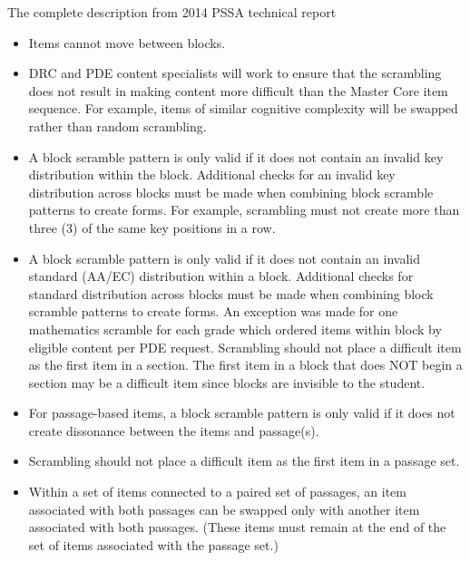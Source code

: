 \documentclass[11pt]{article}
\begin{document}
The complete description from 2014 PSSA technical report
\begin{itemize}
\item Items cannot move between blocks.
\item DRC and PDE content specialists will work to ensure that the
  scrambling does not result in making content more difficult than the
  Master Core item sequence. For example, items of similar cognitive
  complexity will be swapped rather than random scrambling.
\item A block scramble pattern is only valid if it does not contain an
  invalid key distribution within the block. Additional checks for an
  invalid key distribution across blocks must be made when combining
  block scramble patterns to create forms. For example, scrambling
  must not create more than three (3) of the same key positions in a
  row.
\item A block scramble pattern is only valid if it does not contain an
  invalid standard (AA/EC) distribution within a block. Additional
  checks for standard distribution across blocks must be made when
  combining block scramble patterns to create forms.  An exception was
  made for one mathematics scramble for each grade which ordered items
  within block by eligible content per PDE request.  Scrambling should
  not place a difficult item as the first item in a section. The first
  item in a block that does NOT begin a section may be a difficult
  item since blocks are invisible to the student.
\item For passage-based items, a block scramble pattern is only valid
  if it does not create dissonance between the items and passage(s).
\item Scrambling should not place a difficult item as the first item
  in a passage set.
\item Within a set of items connected to a paired set of passages, an
  item associated with both passages can be swapped only with another
  item associated with both passages.  (These items must remain at the
  end of the set of items associated with the passage set.)

\end{itemize}
\end{document}
